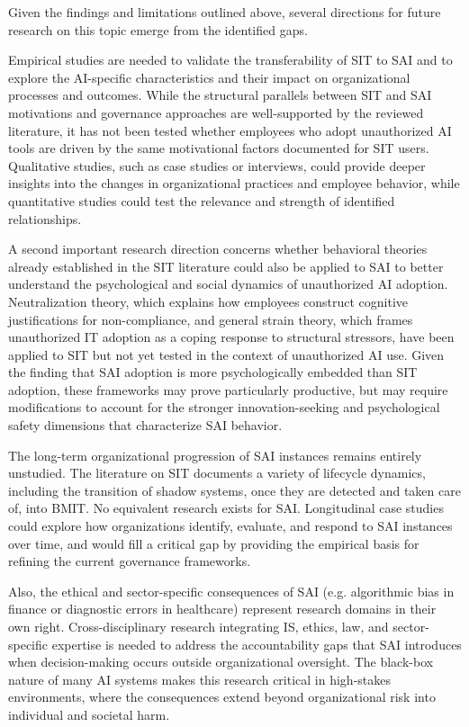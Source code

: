 \documentclass[12pt,oneside]{article}
\begin{document}
Given the findings and limitations outlined above, several directions for future research on this topic emerge from the identified gaps.

Empirical studies are needed to validate the transferability of \ac{SIT} to \ac{SAI} and to explore the \ac{AI}-specific characteristics and their impact on organizational processes and outcomes. While the structural parallels between \ac{SIT} and \ac{SAI} motivations and governance approaches are well-supported by the reviewed literature, it has not been tested whether employees who adopt unauthorized \ac{AI} tools are driven by the same motivational factors documented for \ac{SIT} users. Qualitative studies, such as case studies or interviews, could provide deeper insights into the changes in organizational practices and employee behavior, while quantitative studies could test the relevance and strength of identified relationships. 

A second important research direction concerns whether behavioral theories already established in the \ac{SIT} literature could also be applied to \ac{SAI} to better understand the psychological and social dynamics of unauthorized \ac{AI} adoption. Neutralization theory, which explains how employees construct cognitive justifications for non-compliance, and general strain theory, which frames unauthorized \ac{IT} adoption as a coping response to structural stressors, have been applied to \ac{SIT} but not yet tested in the context of unauthorized \ac{AI} use. Given the finding that \ac{SAI} adoption is more psychologically embedded than \ac{SIT} adoption, these frameworks may prove particularly productive, but may require modifications to account for the stronger innovation-seeking and psychological safety dimensions that characterize \ac{SAI} behavior.

The long-term organizational progression of \ac{SAI} instances remains entirely unstudied. The literature on \ac{SIT} documents a variety of lifecycle dynamics, including the transition of shadow systems, once they are detected and taken care of, into \ac{BMIT}. No equivalent research exists for \ac{SAI}. Longitudinal case studies could explore how organizations identify, evaluate, and respond to \ac{SAI} instances over time, and would fill a critical gap by providing the empirical basis for refining the current governance frameworks.

Also, the ethical and sector-specific consequences of \ac{SAI} (e.g. algorithmic bias in finance or diagnostic errors in healthcare) represent research domains in their own right. Cross-disciplinary research integrating \ac{IS}, ethics, law, and sector-specific expertise is needed to address the accountability gaps that \ac{SAI} introduces when decision-making occurs outside organizational oversight. The black-box nature of many \ac{AI} systems makes this research critical in high-stakes environments, where the consequences extend beyond organizational risk into individual and societal harm.
\end{document}
